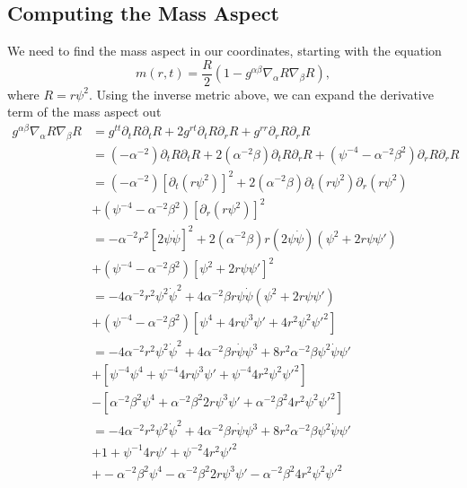 \documentclass[12pt]{article}
\numberwithin{equation}{section}
\begin{document}
\subsection{Computing the Mass Aspect}
We need to find the mass aspect in our coordinates, starting with the equation
\begin{equation}
m(r, t) = \frac{R}{2} (1 - g^{\alpha \beta} \nabla_\alpha R \nabla_\beta R),
\end{equation}
where $R = r \psi^2$.  Using the inverse metric above, we can expand the derivative term of the mass aspect out
\begin{equation}
\begin{aligned}
g^{\alpha \beta} \nabla_\alpha R \nabla_\beta R &= g^{tt} \partial_t R \partial_t R + 2 g^{rt} \partial_t R \partial_r R + g^{rr} \partial_r R \partial_r R \\
&= (-\alpha^{-2}) \partial_t R \partial_t R + 2 (\alpha^{-2} \beta) \partial_t R \partial_r R + (\psi^{-4} - \alpha^{-2} \beta^2) \partial_r R \partial_r R \\
&= (-\alpha^{-2}) [\partial_t (r \psi^2)]^2 + 2 (\alpha^{-2} \beta) \partial_t (r \psi^2) \partial_r (r \psi^2) \\
&+ (\psi^{-4} - \alpha^{-2} \beta^2) [\partial_r (r \psi^2)]^2 \\
&= -\alpha^{-2} r^2 [2 \psi \dot{\psi}]^2 + 2 (\alpha^{-2} \beta) r (2 \psi \dot{\psi}) (\psi^2 + 2 r \psi \psi') \\
&+ (\psi^{-4} - \alpha^{-2} \beta^2) [\psi^2 + 2 r \psi \psi']^2 \\
&= -4 \alpha^{-2} r^2 \psi^2 \dot{\psi}^2 + 4 \alpha^{-2} \beta r \psi \dot{\psi} (\psi^2 + 2 r \psi \psi') \\
&+ (\psi^{-4} - \alpha^{-2} \beta^2) [\psi^4 + 4 r \psi^3 \psi' + 4 r^2 \psi^2 \psi'^2] \\
&= -4 \alpha^{-2} r^2 \psi^2 \dot{\psi}^2 + 4 \alpha^{-2} \beta r \dot{\psi} \psi^3 + 8 r^2 \alpha^{-2} \beta \psi^2 \dot{\psi} \psi' \\
&+ [\psi^{-4} \psi^4 + \psi^{-4} 4 r \psi^3 \psi' + \psi^{-4} 4 r^2 \psi^2 \psi'^2] \\
&- [\alpha^{-2} \beta^2 \psi^4 + \alpha^{-2} \beta^2 2 r \psi^3 \psi' + \alpha^{-2} \beta^2 4 r^2 \psi^2 \psi'^2] \\
&= -4 \alpha^{-2} r^2 \psi^2 \dot{\psi}^2 + 4 \alpha^{-2} \beta r \dot{\psi} \psi^3 + 8 r^2 \alpha^{-2} \beta \psi^2 \dot{\psi} \psi' \\
&+ 1 + \psi^{-1} 4 r \psi' + \psi^{-2} 4 r^2 \psi'^2 \\
&+ -\alpha^{-2} \beta^2 \psi^4 - \alpha^{-2} \beta^2 2 r \psi^3 \psi' - \alpha^{-2} \beta^2 4 r^2 \psi^2 \psi'^2 \\
\end{aligned}
\end{equation}
\end{document}
